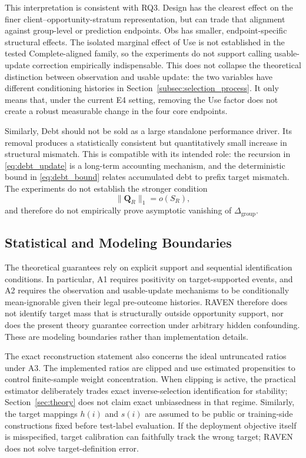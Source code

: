 \documentclass[letterpaper,journal]{IEEEtran}
\begin{document}
This interpretation is consistent with RQ3.  Design has the clearest effect on
the finer client--opportunity-stratum representation, but can trade that
alignment against group-level or prediction endpoints.  Obs has smaller,
endpoint-specific structural effects.  The isolated marginal effect of Use is
not established in the tested Complete-aligned family, so the experiments do
not support calling usable-update correction empirically indispensable.  This
does not collapse the theoretical distinction between observation and usable
update: the two variables have different conditioning histories in
Section~\ref{subsec:selection_process}.  It only means that, under the current
E4 setting, removing the Use factor does not create a robust measurable
change in the four core endpoints.

Similarly, Debt should not be sold as a large standalone performance driver.
Its removal produces a statistically consistent but quantitatively small
increase in structural mismatch.  This is compatible with its intended role:
the recursion in \eqref{eq:debt_update} is a long-term accounting mechanism,
and the deterministic bound in \eqref{eq:debt_bound} relates accumulated debt
to prefix target mismatch.  The experiments do not establish the stronger
condition
\begin{equation}
    \|\mathbf Q_R\|_1=o(S_R),
\end{equation}
and therefore do not empirically prove asymptotic vanishing of
$\Delta_{\mathrm{group}}$.

\subsection{Statistical and Modeling Boundaries}
\label{subsec:discussion_statistical_limits}

The theoretical guarantees rely on explicit support and sequential
identification conditions.  In particular, A1 requires positivity on
target-supported events, and A2 requires the observation and usable-update
mechanisms to be conditionally mean-ignorable given their legal pre-outcome
histories.  RAVEN therefore does not identify target mass that is structurally
outside opportunity support, nor does the present theory guarantee correction
under arbitrary hidden confounding.  These are modeling boundaries rather than
implementation details.

The exact reconstruction statement also concerns the ideal untruncated ratios
under A3.  The implemented ratios are clipped and use estimated propensities to
control finite-sample weight concentration.  When clipping is active, the
practical estimator deliberately trades exact inverse-selection identification
for stability; Section~\ref{sec:theory} does not claim exact unbiasedness in
that regime.  Similarly, the target mappings $h(i)$ and $s(i)$ are assumed to
be public or training-side constructions fixed before test-label evaluation.
If the deployment objective itself is misspecified, target calibration can
faithfully track the wrong target; RAVEN does not solve target-definition
error.
\end{document}
